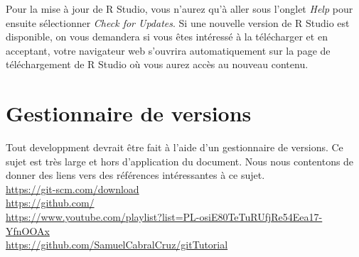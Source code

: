 \vspace{\baselineskip}
Pour la mise à jour de R Studio, vous n'aurez qu'à aller sous l'onglet \emph{Help} pour ensuite sélectionner \emph{Check for Updates}. Si une nouvelle version de R Studio est disponible, on vous demandera si vous êtes intéressé à la télécharger et en acceptant, votre navigateur web s'ouvrira automatiquement sur la page de téléchargement de R Studio où vous aurez accès au nouveau contenu. 

\section{Gestionnaire de versions}
Tout developpment devrait être fait à l'aide d'un gestionnaire de versions. Ce sujet est très large et hors d'application du document. Nous nous contentons de donner des liens vers des références intéressantes à ce sujet. \\
\url{https://git-scm.com/download} \\
\url{https://github.com/} \\
\url{https://www.youtube.com/playlist?list=PL-osiE80TeTuRUfjRe54Eea17-YfnOOAx} \\
\url{https://github.com/SamuelCabralCruz/gitTutorial}